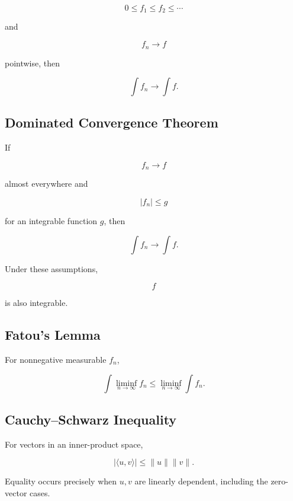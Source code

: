 \[
0\leq f_1\leq f_2\leq\cdots
\]

and

\[
f_n\to f
\]

pointwise, then

\[
\boxed{
\int f_n
\to
\int f.
}
\]

\subsection{Dominated Convergence Theorem}
\label{subsec:dominated-convergence-summary}

If

\[
f_n\to f
\]

almost everywhere and

\[
|f_n|\leq g
\]

for an integrable function \(g\), then

\[
\boxed{
\int f_n
\to
\int f.
}
\]

Under these assumptions,

\[
f
\]

is also integrable.

\subsection{Fatou's Lemma}
\label{subsec:fatou-summary}

For nonnegative measurable \(f_n\),

\[
\boxed{
\int
\liminf_{n\to\infty}f_n
\leq
\liminf_{n\to\infty}
\int f_n.
}
\]

\subsection{Cauchy--Schwarz Inequality}
\label{subsec:cauchy-schwarz-summary}

For vectors in an inner-product space,

\[
\boxed{
|\langle u,v\rangle|
\leq
\|u\|\|v\|.
}
\]

Equality occurs precisely when \(u,v\) are linearly dependent, including the
zero-vector cases.

